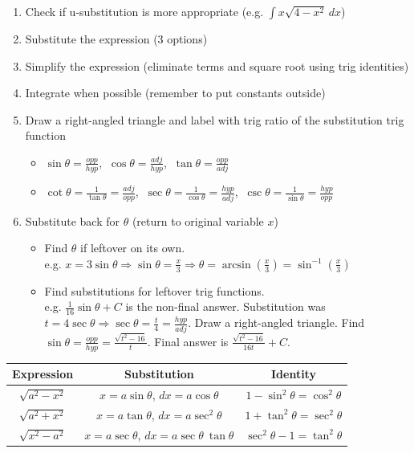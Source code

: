 \documentclass[8pt,letterpaper]{article}
\begin{document}
\begin{enumerate} %
\item Check if u-substitution is more appropriate (e.g. $\int x \sqrt{4-x^2}\,dx$)
\item Substitute the expression (3 options)
\item Simplify the expression (eliminate terms and square root using trig identities)
\item Integrate when possible (remember to put constants outside)
\item Draw a right-angled triangle and label with trig ratio of the substitution trig function
\begin{itemize}
\item $\sin \theta = \frac{opp}{hyp}$, $\:\cos \theta = \frac{adj}{hyp}$, $\:\tan \theta = \frac{opp}{adj}$
\item $\cot \theta = \frac{1}{\tan \theta} = \frac{adj}{opp}$, $\:\sec \theta = \frac{1}{\cos \theta} = \frac{hyp}{adj}$, $\:\csc \theta = \frac{1}{\sin \theta} = \frac{hyp}{opp}$
\end{itemize}
\item Substitute back for $\theta$ (return to original variable $x$)
\begin{itemize}
\item Find $\theta$ if leftover on its own. \\
e.g. $x = 3 \sin \theta \Rightarrow \sin \theta = \frac{x}{3} \Rightarrow \theta = \arcsin (\frac{x}{3}) = \sin^{-1} (\frac{x}{3})$
\item Find substitutions for leftover trig functions. \\
e.g. $\frac{1}{16} \sin \theta + C$ is the non-final answer. Substitution was $t = 4 \sec \theta \Rightarrow \sec \theta = \frac{t}{4} = \frac{hyp}{adj}$. Draw a right-angled triangle.
Find $\sin \theta = \frac{opp}{hyp} = \frac{\sqrt{t^2-16}}{t}$. Final answer is $\frac{\sqrt{t^2-16}}{16t} + C$.

\end{itemize}
\end{enumerate}

\begin{tabular}{|c|c|c|}
\hline 
Expression & Substitution & Identity \\
\hline
$\sqrt{a^2 - x^2}$ &
$x = a \sin \theta$, $dx = a \cos \theta$ & %
$1 - \sin^2\theta = \cos^2\theta$
\\
$\sqrt{a^2 + x^2}$ &
$x = a \tan \theta$, $dx = a \sec^2 \theta$ & %
$1 + \tan^2\theta = \sec^2\theta$
\\ 
$\sqrt{x^2 - a^2}$ &
$x = a \sec \theta$, $dx = a \sec \theta \: \tan \theta$ & %
$\sec^2\theta - 1 = \tan^2\theta$
\\ 
\hline 
\end{tabular} 
\end{document}
